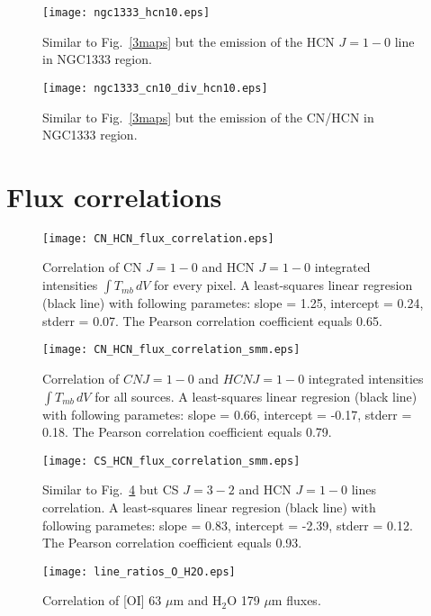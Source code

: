 \documentclass{aa}
\begin{document}
\begin{appendix}
\begin{figure}
\texttt{[image: ngc1333\_hcn10.eps]}
\caption{Similar to Fig.~\ref{3maps} but the emission of the HCN $J=1-0$ line in NGC1333 region. }
\label{ngc1333_hcn}
\end{figure}

\begin{figure}
\texttt{[image: ngc1333\_cn10\_div\_hcn10.eps]}
\caption{Similar to Fig.~\ref{3maps} but the emission of the CN/HCN in NGC1333 region. }
\label{ngc1333_cn_div_hcn}
\end{figure}

\section{Flux correlations}

\begin{figure}
\texttt{[image: CN\_HCN\_flux\_correlation.eps]}
\caption{Correlation of CN $J=1-0$ and HCN $J=1-0$ integrated intensities $\int{T_{mb} \, dV}$ for every pixel. A least-squares linear regresion (black line) with following parametes: slope = 1.25, intercept = 0.24, stderr = 0.07. The Pearson correlation coefficient equals 0.65. }
\label{CN_HCN_corr_all}
\end{figure}

\begin{figure}
\texttt{[image: CN\_HCN\_flux\_correlation\_smm.eps]}
\caption{Correlation of $CN J=1-0$ and $HCN J=1-0$ integrated intensities $\int{T_{mb} \, dV}$ for all sources. A least-squares linear regresion (black line) with following parametes: slope = 0.66, intercept = -0.17, stderr = 0.18. The Pearson correlation coefficient equals 0.79. }
\label{CN_HCN_corr_smm}
\end{figure}

\begin{figure}
\texttt{[image: CS\_HCN\_flux\_correlation\_smm.eps]}
\caption{Similar to Fig.~\ref{CN_HCN_corr_smm} but CS $J=3-2$ and HCN $J=1-0$ lines correlation. A least-squares linear regresion (black line) with following parametes: slope = 0.83, intercept = -2.39, stderr = 0.12. The Pearson correlation coefficient equals 0.93. }
\label{CS_HCN_corr_smm}
\end{figure}

\begin{figure}
\texttt{[image: line\_ratios\_O\_H2O.eps]}
\caption{Correlation of [OI] 63 $\mu$m and H$_2$O 179 $\mu$m fluxes.}
\label{h13cn10}
\end{figure}


\end{appendix}
\end{document}
